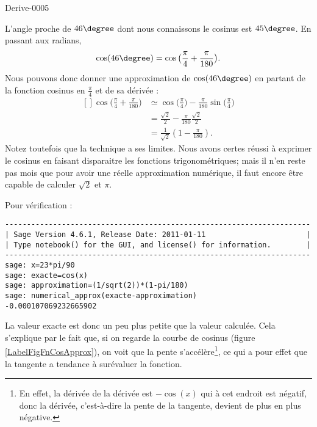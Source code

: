 
\begin{corrige}{Derive-0005}

    L'angle proche de $46\degree$ dont nous connaissons le cosinus est $45\degree$. En passant aux radians,
    \begin{equation}
        \cos(46\degree)=\cos\big( \frac{ \pi }{ 4 }+\frac{ \pi }{ 180 } \big).
    \end{equation}
    Nous pouvons donc donner une approximation de $\cos(46\degree)$ en partant de la fonction cosinus en $\frac{ \pi }{ 4 }$ et de sa dérivée :
    \begin{equation}
        \begin{aligned}[]
            \cos\big( \frac{ \pi }{ 4 }+\frac{ \pi }{ 180 } \big)&\simeq\cos\big( \frac{ \pi }{ 4 } \big)-\frac{ \pi }{ 180 }\sin\big( \frac{ \pi }{ 4 } \big)\\
            &=\frac{ \sqrt{2} }{2}-\frac{ \pi }{ 180 }\frac{ \sqrt{2} }{2}\\
            &=\frac{1}{ \sqrt{2} }\left( 1-\frac{ \pi }{ 180 } \right).
        \end{aligned}
    \end{equation}
    Notez toutefois que la technique a ses limites. Nous avons certes réussi à exprimer le cosinus en faisant disparaitre les fonctions trigonométriques; mais il n'en reste pas mois que pour avoir une réelle approximation numérique, il faut encore être capable de calculer $\sqrt{2}$ et $\pi$.

    Pour vérification :
    \begin{verbatim}
----------------------------------------------------------------------
| Sage Version 4.6.1, Release Date: 2011-01-11                       |
| Type notebook() for the GUI, and license() for information.        |
----------------------------------------------------------------------
sage: x=23*pi/90 
sage: exacte=cos(x)
sage: approximation=(1/sqrt(2))*(1-pi/180)
sage: numerical_approx(exacte-approximation)
-0.000107069232665902
    \end{verbatim}
    La valeur exacte est donc un peu plus petite que la valeur calculée. Cela s'explique par le fait que, si on regarde la courbe de cosinus (figure \ref{LabelFigFnCosApprox}), on voit que la pente s'accélère\footnote{En effet, la dérivée de la dérivée est $-\cos(x)$ qui à cet endroit est négatif, donc la dérivée, c'est-à-dire la pente de la tangente, devient de plus en plus négative.}, ce qui a pour effet que la tangente a tendance à surévaluer la fonction.

    \newcommand{\CaptionFigFnCosApprox}{La fonction cosinus autour de $\frac{ \pi }{2}$.}
    

\end{corrige}
